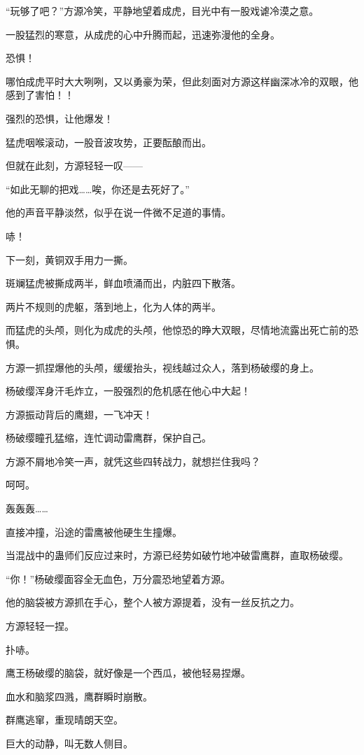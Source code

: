 \begin{this_body}
“玩够了吧？”方源冷笑，平静地望着成虎，目光中有一股戏谑冷漠之意。

一股猛烈的寒意，从成虎的心中升腾而起，迅速弥漫他的全身。

恐惧！

哪怕成虎平时大大咧咧，又以勇豪为荣，但此刻面对方源这样幽深冰冷的双眼，他感到了害怕！！

强烈的恐惧，让他爆发！

猛虎咽喉滚动，一股音波攻势，正要酝酿而出。

但就在此刻，方源轻轻一叹——

“如此无聊的把戏……唉，你还是去死好了。”

他的声音平静淡然，似乎在说一件微不足道的事情。

哧！

下一刻，黄铜双手用力一撕。

斑斓猛虎被撕成两半，鲜血喷涌而出，内脏四下散落。

两片不规则的虎躯，落到地上，化为人体的两半。

而猛虎的头颅，则化为成虎的头颅，他惊恐的睁大双眼，尽情地流露出死亡前的恐惧。

方源一抓捏爆他的头颅，缓缓抬头，视线越过众人，落到杨破缨的身上。

杨破缨浑身汗毛炸立，一股强烈的危机感在他心中大起！

方源振动背后的鹰翅，一飞冲天！

杨破缨瞳孔猛缩，连忙调动雷鹰群，保护自己。

方源不屑地冷笑一声，就凭这些四转战力，就想拦住我吗？

呵呵。

轰轰轰……

直接冲撞，沿途的雷鹰被他硬生生撞爆。

当混战中的蛊师们反应过来时，方源已经势如破竹地冲破雷鹰群，直取杨破缨。

“你！”杨破缨面容全无血色，万分震恐地望着方源。

他的脑袋被方源抓在手心，整个人被方源提着，没有一丝反抗之力。

方源轻轻一捏。

扑哧。

鹰王杨破缨的脑袋，就好像是一个西瓜，被他轻易捏爆。

血水和脑浆四溅，鹰群瞬时崩散。

群鹰逃窜，重现晴朗天空。

巨大的动静，叫无数人侧目。


\end{this_body}
